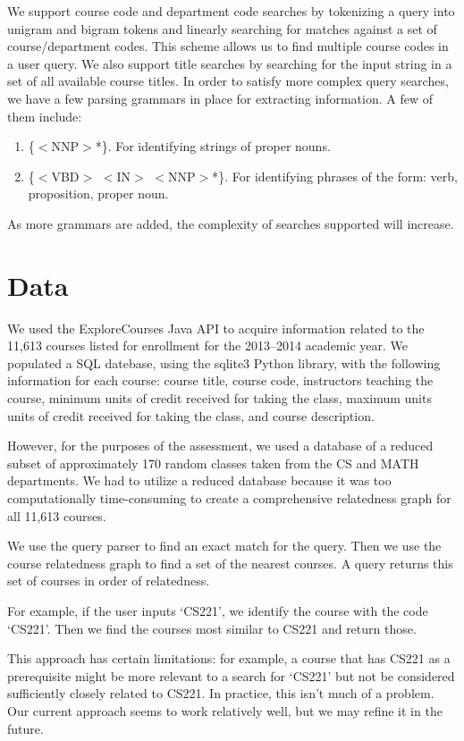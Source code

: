 \documentclass[12pt]{article}
\begin{document}
We support course code and department code searches by tokenizing a query into unigram and bigram
tokens and linearly searching for matches against a set of course/department codes. This scheme allows us to find multiple course codes in a user query. We
also support title searches by searching for the input string in a set
of all available course titles. In order to satisfy more complex query searches, we have a few parsing grammars in place for extracting information. A few of them include:
\begin{enumerate}
	\item \{$<$NNP$>$*\}. For identifying strings of proper nouns.

	\item \{$<$VBD$>$ $<$IN$>$ $<$NNP$>$*\}. For identifying phrases of the form: verb, proposition, proper noun.
\end{enumerate}

As more grammars are added, the complexity of searches supported will increase.


\section*{Data}
We used the ExploreCourses Java API to acquire information related to
the 11,613 courses listed for enrollment for the 2013–2014 academic
year. We populated a SQL datebase, using the sqlite3 Python library,
with the following information for each course: course title, course
code, instructors teaching the course, minimum units of credit
received for taking the class, maximum units units of credit received
for taking the class, and course description.

However, for the purposes of the assessment, we used a database of a
reduced subset of approximately 170 random classes taken from the CS
and MATH departments. We had to utilize a reduced database because it
was too computationally time-consuming to create a comprehensive relatedness graph for
all 11,613 courses.

We use the query parser to find an exact match for the query. Then we
use the course relatedness graph to find a set of the nearest
courses. A query returns this set of courses in order of relatedness.

For example, if the user inputs `CS221', we identify the course with
the code `CS221'. Then we find the courses most similar to CS221 and
return those.

This approach has certain limitations: for example, a course that has
CS221 as a prerequisite might be more relevant to a search for `CS221'
but not be considered sufficiently closely related to CS221. In
practice, this isn't much of a problem. Our current approach seems to
work relatively well, but we may refine it in the future.
\end{document}
